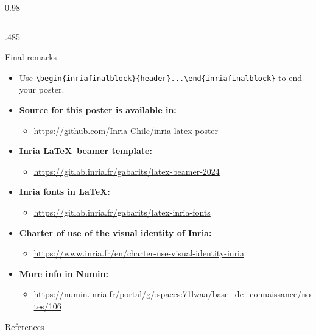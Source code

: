 \documentclass[final,svgnames,english]{beamer}
\begin{document}
\begin{frame}[fragile]{}
\begin{columns}[T]
\begin{column}{0.98\linewidth}
\begin{columns}[T]
\begin{column}{.485\linewidth}
          \begin{inriafinalblock}{Final remarks}
            \begin{itemize}
                \item Use \verb|\begin{inriafinalblock}{header}...\end{inriafinalblock}| to end your poster.
              \item \textbf{Source for this poster is available in:}
                \begin{itemize}
                  \item \url{https://github.com/Inria-Chile/inria-latex-poster}
                \end{itemize}
              \item \textbf{Inria \LaTeX\ beamer template:}
                \begin{itemize}
                  \item \url{https://gitlab.inria.fr/gabarits/latex-beamer-2024}
                \end{itemize}
              \item \textbf{Inria fonts in \LaTeX:}
                \begin{itemize}
                  \item \url{https://gitlab.inria.fr/gabarits/latex-inria-fonts}
                \end{itemize}
              \item \textbf{Charter of use of the visual identity of Inria:}
                \begin{itemize}
                  \item \url{https://www.inria.fr/en/charter-use-visual-identity-inria}
                \end{itemize}
              \item \textbf{More info in Numin:}
                \begin{itemize}
                  \item \url{https://numin.inria.fr/portal/g/:spaces:71lwaa/base_de_connaissance/notes/106}
                \end{itemize}
            \end{itemize}
          \end{inriafinalblock}
          \begin{plainblock}{\small References}
            \setlength{\bibitemsep}{0.29em}
            \printbibliography[notcategory=thispapercat]
          \end{plainblock}
          

\end{column}
\end{columns}
\end{column}
\end{columns}
\end{frame}
\end{document}
